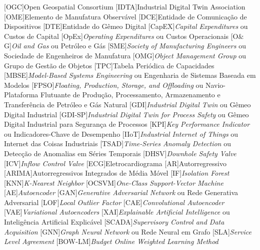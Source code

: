 \begin{acronym}
    [OGC]{Open Geospatial Consortium}
    [IDTA]{Industrial Digital Twin Association}
    [OME]{Elemento de Manufatura Observável}
    [DCE]{Entidade de Comunicação de Dispositivos}
    [DTE]{Entidade do Gêmeo Digital}
    [CapEX]{\textit{Capital Expenditures} ou Custos de Capital}
    [OpEx]{\textit{Operating Expenditures} ou Custos Operacionais}
    [O$\&$G]{\textit{Oil and Gas} ou Petróleo e Gás}
    [SME]{\textit{Society of Manufacturing Engineers} ou Sociedade de Engenheiros de Manufatura}
    [OMG]{\textit{Object Management Group} ou Grupo de Gestão de Objetos}
    [TPC]{Tabela Periódica de Capacidades}
    [MBSE]{\textit{Model-Based Systems Engineering} ou Engenharia de Sistemas Baseada em Modelos}
    [FPSO]{\textit{Floating, Production, Storage, and Offloading} ou Navio-Plataforma Flutuante de Produção, Processamento, Armazenamento e Transferência de Petróleo e Gás Natural}
    [GDI]{\textit{Industrial Digital Twin} ou Gêmeo Digital Industrial}
    [GDI-SP]{\textit{Industrial Digital Twin for Process Safety} ou Gêmeo Digital Industrial para Segurança de Processos}
    [KPI]{\textit{Key Performance Indicator} ou Indicadores-Chave de Desempenho}
    [IIoT]{\textit{Industrial Internet of Things} ou Internet das Coisas Industriais}
    [TSAD]{\textit{Time-Series Anomaly Detection} ou Detecção de Anomalias em Séries Temporais}
    [DHSV]{\textit{Downhole Safety Valve}}
    [ICV]{\textit{Inflow Control Valve}}
    [ECG]{Eletrocardiograma}
    [AR]{Autorregressivo}
    [ARIMA]{Autorregressivos Integrados de Média Móvel}
    [IF]{\textit{Isolation Forest}}
    [KNN]{\textit{K-Nearest Neighbor}}
    [OCSVM]{\textit{One-Class Support-Vector Machine}}
    [AE]{\textit{Autoencoder}}
    [GAN]{\textit{Generative Adversarial Network} ou Rede Generativa Adversarial}
    [LOF]{\textit{Local Outlier Factor}}
    [CAE]{\textit{Convolutional Autoencoder}}
    [VAE]{\textit{Variational Autoencoders}}
    [XAI]{\textit{Explainable Artificial Intelligence} ou Inteligência Artificial Explicável}
    [SCADA]{\textit{Supervisory Control and Data Acquisition}}
    [GNN]{\textit{Graph Neural Network} ou Rede Neural em Grafo}
    [SLA]{\textit{Service Level Agreement}}
    [BOW-LM]{\textit{Budget Online Weighted Learning Method}}

\end{acronym}
